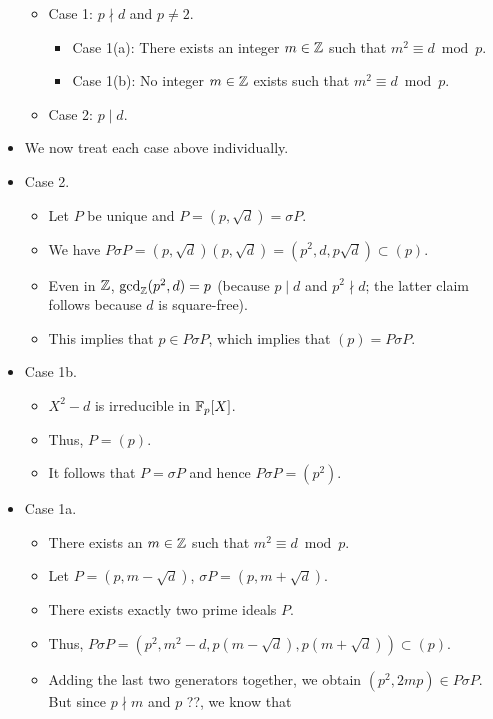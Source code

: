 \documentclass[../notes.tex]{subfiles}
\begin{document}
\begin{itemize}
\begin{itemize}
\begin{equation*}
        \end{equation*}
        \item Case 1: $p\nmid d$ and $p\neq 2$.
        \begin{itemize}
            \item Case 1(a): There exists an integer $m\in\mathbb{Z}$ such that $m^2\equiv d\bmod p$.
            \item Case 1(b): No integer $m\in\mathbb{Z}$ exists such that $m^2\equiv d\bmod p$.
        \end{itemize}
        \item Case 2: $p\mid d$.
    \end{itemize}
    \item We now treat each case above individually.
    \item Case 2.
    \begin{itemize}
        \item Let $P$ be unique and $P=(p,\sqrt{d})=\sigma P$.
        \item We have $P\sigma P=(p,\sqrt{d})(p,\sqrt{d})=(p^2,d,p\sqrt{d})\subset(p)$.
        \item Even in $\mathbb{Z}$, $\gcd_{\mathbb{Z}}(p^2,d)=p$ (because $p\mid d$ and $p^2\nmid d$; the latter claim follows because $d$ is square-free).
        \item This implies that $p\in P\sigma P$, which implies that $(p)=P\sigma P$.
    \end{itemize}
    \item Case 1b.
    \begin{itemize}
        \item $X^2-d$ is irreducible in $\mathbb{F}_p[X]$.
        \item Thus, $P=(p)$.
        \item It follows that $P=\sigma P$ and hence $P\sigma P=(p^2)$.
    \end{itemize}
    \item Case 1a.
    \begin{itemize}
        \item There exists an $m\in\mathbb{Z}$ such that $m^2\equiv d\bmod p$.
        \item Let $P=(p,m-\sqrt{d})$, $\sigma P=(p,m+\sqrt{d})$.
        \item There exists exactly two prime ideals $P$.
        \item Thus, $P\sigma P=(p^2,m^2-d,p(m-\sqrt{d}),p(m+\sqrt{d}))\subset(p)$.
        \item Adding the last two generators together, we obtain $(p^2,2mp)\in P\sigma P$. But since $p\nmid m$ and $p$ ??, we know that

\end{itemize}
\end{itemize}
\end{document}

